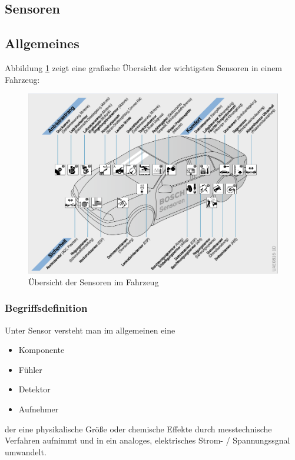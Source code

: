 \graphicspath{{./Images/Kapitel5/}}
	
\begin{flushleft}
		
	\section{Sensoren}
		\subsection{Allgemeines} 
		
		Abbildung \ref{fig:TS01} zeigt eine grafische Übersicht der wichtigsten Sensoren in einem Fahrzeug:
				
		\begin{figure}[h!]
			\includegraphics[width=\textwidth] {sensor_uebersicht.png}
	        \caption{Übersicht der Sensoren im Fahrzeug \cite{BP01}}
	        \label{fig:TS01}
		\end{figure}	
		
			\subsubsection{Begriffsdefinition}
		
	        Unter Sensor versteht man im allgemeinen eine
	        \begin{itemize}
	            \item Komponente
	            \item Fühler
	            \item Detektor
	            \item Aufnehmer
	        \end{itemize}
	            der eine physikalische Größe oder chemische Effekte durch messtechnische Verfahren aufnimmt und in ein analoges, elektrisches Strom- / Spannungssgnal umwandelt.
	        

\end{flushleft}
